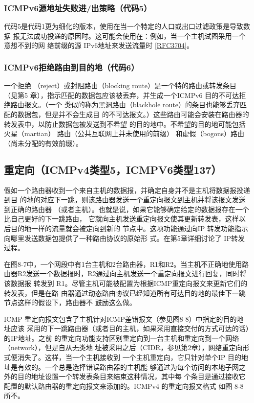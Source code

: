 \subsubsection{ICMPv6源地址失败进/出策略（代码5）}

代码5是代码1更为细化的版本，使用在当一个特定的人口或出口过滤政策是导致数据
报无法成功投递的原因时。这可能会使用在：例如，当一个主机试图采用一个意想不到的网
络前缀的源 IPv6地址来发送流量时 \href{https://www.rfc-editor.org/rfc/rfc3704}{[RFC3704]}。

\subsubsection{ICMPv6拒绝路由到目的地（代码6）}
一个拒绝 （reject）或封阻路由（blocking route）是一个特的路由或转发条目（见第5
章），指示匹配的数据包应该被丢弃，并生成一个ICMPv6 目的不可达拒绝路由报文。（一个
类似的称为黑洞路由（blackhole route）的条目也能够丢弃匹配的数据包，但是并不会生成目
的不可达报文。）这些路由可能会安装在路由器的转发表中，以防止数据包被发送到不希望
的目的地中。不希望的目的地可能包括火星（martian） 路由（公共互联网上并未使用的前缀）
和虚假（bogons）路由（尚未分配的有效前缀）。

\subsection{重定向（ICMPv4类型5，ICMPV6类型137）}

假如一个路由器收到一个来自主机的数据报，并确定自身并不是主机将数据报投递到目
的地的对应下一跳，则该路由器发送一个重定向报文到主机并将该报文发送到正确的路由器
（或者主机）。也就是说，如果它能够确定给定的数据报存在一个比自己更好的下一跳路由，
它就向主机发送重定向报文使其更新转发表，这样以后目的地一样的流量就会被定向到新的
节点中。这项功能通过向IP 转发功能指示向哪里发送数据包提供了一种路由协议的原始形
式。在第5章详细讨论了 IP转发过程。

在图8-7中，一个网段中有1台主机和2台路由器，R1和R2。当主机不正确地使用路
由器R2发送一个数据报时，R2通过向主机发送一个重定向报文进行回复，同时将该数据报
转发到 R1。尽管主机可能被配置为根据ICMP重定向报文来更新它们的转发表，但是在路
由器通过动态路由协议已经知道所有可达目的地的最佳下一跳节点这样的假设下，路由器不
鼓励这么做。

ICMP 重定向报文包含了主机针对ICMP差错报文（参见图8-8）中指定的目的地址应该
采用的下一跳路由器（或者目的主机，如果采用直接交付的方式可达的话）的IP地址。之前
的重定向功能支持区别重定向到一台主机和重定向到一个网络（network），但是自从无类地
址被采用之后（CIDR，参见第2章），网络重定向形式便消失了。这样，当一个主机接收到
一个主机重定向，它只针对单个IP 目的地址是有效的。一个总是选择错误路由器的主机能
够通过为每个访问的本地子网之外的目的地址设置一个转发表条目来结束这种情况，其中每
个条目是通过接收它配置的默认路由器的重定向报文来添加的。ICMPv4 的重定向报文格式
如图 8-8 所不。

